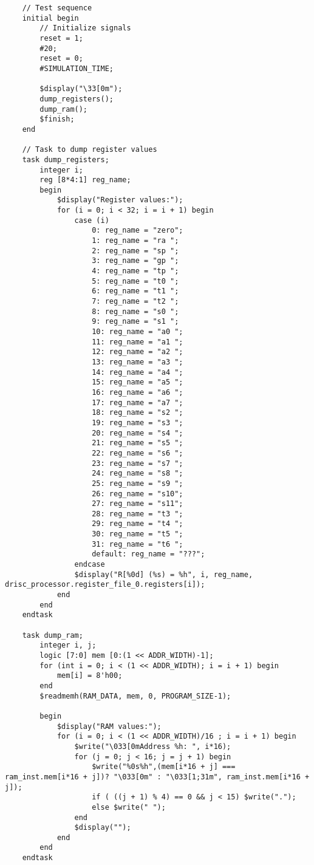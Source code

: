 \begin{lstlisting}
    // Test sequence
    initial begin
        // Initialize signals
        reset = 1;
        #20;
        reset = 0; 
        #SIMULATION_TIME;

        $display("\33[0m");
        dump_registers();
        dump_ram();
        $finish;
    end

    // Task to dump register values
    task dump_registers;
        integer i;
        reg [8*4:1] reg_name;
        begin
            $display("Register values:");
            for (i = 0; i < 32; i = i + 1) begin
                case (i)
                    0: reg_name = "zero";
                    1: reg_name = "ra ";
                    2: reg_name = "sp ";
                    3: reg_name = "gp ";
                    4: reg_name = "tp ";
                    5: reg_name = "t0 ";
                    6: reg_name = "t1 ";
                    7: reg_name = "t2 ";
                    8: reg_name = "s0 ";
                    9: reg_name = "s1 ";
                    10: reg_name = "a0 ";
                    11: reg_name = "a1 ";
                    12: reg_name = "a2 ";
                    13: reg_name = "a3 ";
                    14: reg_name = "a4 ";
                    15: reg_name = "a5 ";
                    16: reg_name = "a6 ";
                    17: reg_name = "a7 ";
                    18: reg_name = "s2 ";
                    19: reg_name = "s3 ";
                    20: reg_name = "s4 ";
                    21: reg_name = "s5 ";
                    22: reg_name = "s6 ";
                    23: reg_name = "s7 ";
                    24: reg_name = "s8 ";
                    25: reg_name = "s9 ";
                    26: reg_name = "s10";
                    27: reg_name = "s11";
                    28: reg_name = "t3 ";
                    29: reg_name = "t4 ";
                    30: reg_name = "t5 ";
                    31: reg_name = "t6 ";
                    default: reg_name = "???";
                endcase
                $display("R[%0d] (%s) = %h", i, reg_name, drisc_processor.register_file_0.registers[i]);
            end
        end
    endtask

    task dump_ram;
        integer i, j;
        logic [7:0] mem [0:(1 << ADDR_WIDTH)-1];
        for (int i = 0; i < (1 << ADDR_WIDTH); i = i + 1) begin
            mem[i] = 8'h00;
        end
        $readmemh(RAM_DATA, mem, 0, PROGRAM_SIZE-1);

        begin
            $display("RAM values:");
            for (i = 0; i < (1 << ADDR_WIDTH)/16 ; i = i + 1) begin
                $write("\033[0mAddress %h: ", i*16);
                for (j = 0; j < 16; j = j + 1) begin
                    $write("%0s%h",(mem[i*16 + j] === ram_inst.mem[i*16 + j])? "\033[0m" : "\033[1;31m", ram_inst.mem[i*16 + j]);
                    if ( ((j + 1) % 4) == 0 && j < 15) $write(".");
                    else $write(" ");
                end
                $display("");
            end
        end
    endtask


\end{lstlisting}
